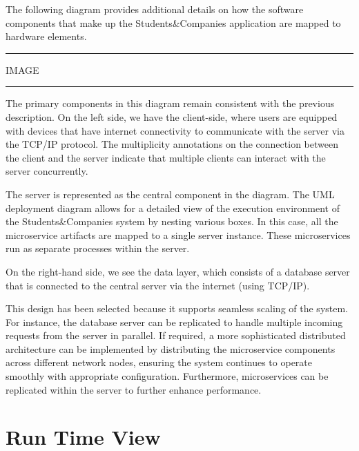 The following diagram provides additional details on how the software components that make up the Students\&Companies application are mapped to hardware elements.

\vspace{20pt}
\hrule
\vspace{10pt}
IMAGE
\vspace{10pt}
\hrule
\vspace{20pt}

The primary components in this diagram remain consistent with the previous description. On the left side, we have the client-side, where users are equipped with devices that have internet connectivity to communicate with the server via the TCP/IP protocol. The multiplicity annotations on the connection between the client and the server indicate that multiple clients can interact with the server concurrently.

The server is represented as the central component in the diagram. The UML deployment diagram allows for a detailed view of the execution environment of the Students\&Companies system by nesting various boxes. In this case, all the microservice artifacts are mapped to a single server instance. These microservices run as separate processes within the server.

On the right-hand side, we see the data layer, which consists of a database server that is connected to the central server via the internet (using TCP/IP).

This design has been selected because it supports seamless scaling of the system. For instance, the database server can be replicated to handle multiple incoming requests from the server in parallel. If required, a more sophisticated distributed architecture can be implemented by distributing the microservice components across different network nodes, ensuring the system continues to operate smoothly with appropriate configuration. Furthermore, microservices can be replicated within the server to further enhance performance.

\section{Run Time View}

